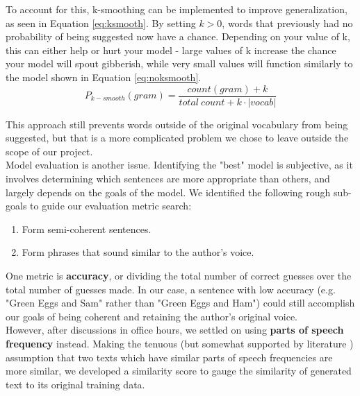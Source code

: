 \documentclass[11pt]{article}
\begin{document}
To account for this, k-smoothing can be implemented to improve generalization, as seen in Equation \ref{eq:ksmooth}.  By setting $k > 0$, words that previously had no probability of being suggested now have a chance. Depending on your value of k, this can either help or hurt your model - large values of k increase the chance your model will spout gibberish, while very small values will function similarly to the model shown in Equation \ref{eq:noksmooth}.\\

\begin{equation}
\label{eq:ksmooth}
P_{k-smooth}(gram) = \frac{count(gram) + k}{total~count+k \cdot |vocab|}
\end{equation} \vspace{0.1em}

This approach still prevents words outside of the original vocabulary from being suggested, but that is a more complicated problem we chose to leave outside the scope of our project.\\

Model evaluation is another issue.  Identifying the "best" model is subjective, as it involves determining which sentences are more appropriate than others, and largely depends on the goals of the model.  We identified the following rough sub-goals to guide our evaluation metric search:

\begin{enumerate}
    \item Form semi-coherent sentences.
    \item Form phrases that sound similar to the author's voice.
\end{enumerate}


One metric is \textbf{accuracy}, or dividing the total number of correct guesses over the total number of guesses made.  In our case, a sentence with low accuracy (e.g. "Green Eggs and Sam" rather than "Green Eggs and Ham") could still accomplish our goals of being coherent and retaining the author's original voice. \\

However, after discussions in office hours, we settled on using \textbf{parts of speech frequency} instead.  Making the tenuous (but somewhat supported by literature \cite{batanovic2015using}) assumption that two texts which have similar parts of speech frequencies are more similar, we developed a similarity score to gauge the similarity of generated text to its original training data.
\end{document}
